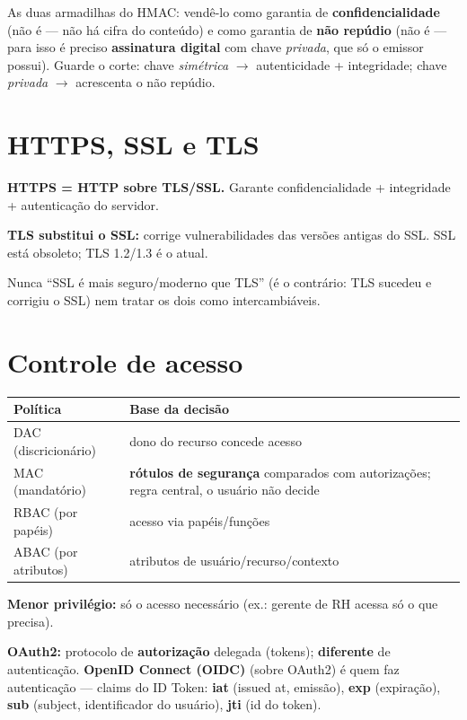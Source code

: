 \begin{pegadinha}
As duas armadilhas do HMAC: vendê-lo como garantia de
\textbf{confidencialidade} (não é --- não há cifra do conteúdo) e como
garantia de \textbf{não repúdio} (não é --- para isso é preciso
\textbf{assinatura digital} com chave \emph{privada}, que só o emissor
possui). Guarde o corte: chave \emph{simétrica} $\to$ autenticidade +
integridade; chave \emph{privada} $\to$ acrescenta o não repúdio.
\end{pegadinha}

\section{HTTPS, SSL e TLS}

\textbf{HTTPS = HTTP sobre TLS/SSL.} Garante confidencialidade + integridade
+ autenticação do servidor.

\textbf{TLS substitui o SSL:} corrige vulnerabilidades das versões antigas
do SSL. SSL está obsoleto; TLS 1.2/1.3 é o atual.

\begin{pegadinha}
Nunca ``SSL é mais seguro/moderno que TLS'' (é o contrário: TLS sucedeu e
corrigiu o SSL) nem tratar os dois como intercambiáveis.
\end{pegadinha}

\section{Controle de acesso}

\begin{center}
\begin{tabular}{@{}p{3cm}p{8.2cm}@{}}
\toprule
\textbf{Política} & \textbf{Base da decisão} \\
\midrule
DAC (discricionário) & dono do recurso concede acesso \\
MAC (mandatório) & \textbf{rótulos de segurança} comparados com autorizações; regra central, o usuário não decide \\
RBAC (por papéis) & acesso via papéis/funções \\
ABAC (por atributos) & atributos de usuário/recurso/contexto \\
\bottomrule
\end{tabular}
\end{center}

\textbf{Menor privilégio:} só o acesso necessário (ex.: gerente de RH acessa
só o que precisa).

\textbf{OAuth2:} protocolo de \textbf{autorização} delegada (tokens);
\textbf{diferente} de autenticação. \textbf{OpenID Connect (OIDC)} (sobre
OAuth2) é quem faz autenticação --- claims do ID Token: \textbf{iat} (issued
at, emissão), \textbf{exp} (expiração), \textbf{sub} (subject, identificador
do usuário), \textbf{jti} (id do token).

